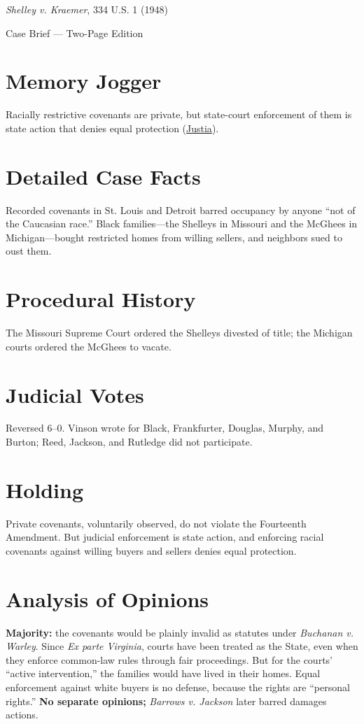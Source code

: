 \documentclass[12pt]{article}
\begin{document}
\begin{center}
{\LARGE \textit{Shelley v. Kraemer}, 334 U.S. 1 (1948)\par}
\vspace{0.5em}
{\large Case Brief --- Two-Page Edition\par}
\end{center}

\section{Memory Jogger}
Racially restrictive covenants are private, but state-court enforcement of them is state action that denies equal protection (\href{https://supreme.justia.com/cases/federal/us/334/1/}{Justia}).

\section{Detailed Case Facts}
Recorded covenants in St. Louis and Detroit barred occupancy by anyone ``not of the Caucasian race.'' Black families---the Shelleys in Missouri and the McGhees in Michigan---bought restricted homes from willing sellers, and neighbors sued to oust them.

\section{Procedural History}
The Missouri Supreme Court ordered the Shelleys divested of title; the Michigan courts ordered the McGhees to vacate.

\section{Judicial Votes}
Reversed 6--0. Vinson wrote for Black, Frankfurter, Douglas, Murphy, and Burton; Reed, Jackson, and Rutledge did not participate.

\section{Holding}
Private covenants, voluntarily observed, do not violate the Fourteenth Amendment. But judicial enforcement is state action, and enforcing racial covenants against willing buyers and sellers denies equal protection.

\section{Analysis of Opinions}
\textbf{Majority:} the covenants would be plainly invalid as statutes under \textit{Buchanan v. Warley}. Since \textit{Ex parte Virginia}, courts have been treated as the State, even when they enforce common-law rules through fair proceedings. But for the courts' ``active intervention,'' the families would have lived in their homes. Equal enforcement against white buyers is no defense, because the rights are ``personal rights.'' \textbf{No separate opinions;} \textit{Barrows v. Jackson} later barred damages actions.
\end{document}
